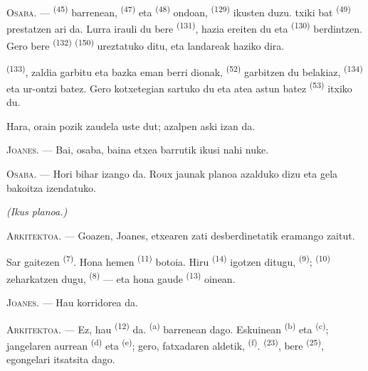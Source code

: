 \textsc{Osaba}. ---  \textsuperscript{(45)} barrenean,
 \textsuperscript{(47)} eta 
\textsuperscript{(48)} ondoan,  \textsuperscript{(129)} ikusten
duzu.  txiki bat \textsuperscript{(49)} prestatzen ari da. Lurra
irauli du bere  \textsuperscript{(131)}, hazia ereiten du eta
 \textsuperscript{(130)} berdintzen. Gero bere
 \textsuperscript{(132)} 
\textsuperscript{(150)} ureztatuko ditu, eta landareak haziko dira.

 \textsuperscript{(133)}, zaldia garbitu eta bazka eman
berri dionak,  \textsuperscript{(52)} garbitzen du belakiaz,
 \textsuperscript{(134)} eta ur-ontzi batez. Gero kotxetegian
sartuko du eta atea  astun batez \textsuperscript{(53)} itxiko
du.

Hara, orain pozik zaudela uste dut; azalpen aski izan da.

\textsc{Joanes}. --- Bai, osaba, baina etxea barrutik ikusi nahi nuke.

\textsc{Osaba}. --- Hori bihar izango da. Roux jaunak planoa azalduko dizu eta
gela bakoitza izendatuko.

\VUsaut{3.0mm}
\VUsaut{2.4mm}

{\centering\textit{(Ikus planoa.)}\par}
\VUsaut{2.4mm}

\textsc{Arkitektoa}. --- Goazen, Joanes, etxearen zati desberdinetatik eramango
zaitut.

Sar gaitezen  \textsuperscript{(7)}. Hona hemen
 \textsuperscript{(11)} botoia. Hiru 
\textsuperscript{(14)} igotzen ditugu, 
\textsuperscript{(9)};  \textsuperscript{(10)} zeharkatzen
dugu,  \textsuperscript{(8)} --- eta hona gaude
\textsuperscript{(13)} oinean.

\textsc{Joanes}. --- Hau korridorea da.

\textsc{Arkitektoa}. --- Ez, hau  \textsuperscript{(12)} da.
 \textsuperscript{(a)} barrenean dago. Eskuinean
 \textsuperscript{(b)} eta 
\textsuperscript{(c)}; jangelaren aurrean 
\textsuperscript{(d)} eta  \textsuperscript{(e)}; gero,
fatxadaren aldetik,  \textsuperscript{(f)}. 
\textsuperscript{(23)}, bere  \textsuperscript{(25)},
egongelari itsatsita dago.

